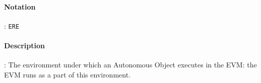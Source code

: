 \documentclass[10pt,a4paper,oneside]{scrartcl}
\author{}
\title{}
\date{}
\begin{document}
\maketitle
\paragraph{Notation}: \texttt{ERE}
\paragraph{Description}: The environment under which an Autonomous Object executes in the EVM: the EVM runs as a part of this environment.  
\end{document}
